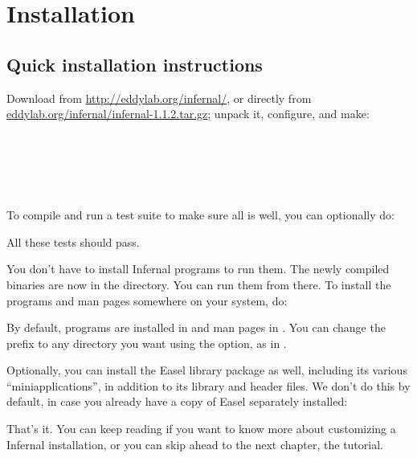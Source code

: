 \section{Installation}
\label{section:installation}
\setcounter{footnote}{0}

\subsection{Quick installation instructions}

Download  from \url{http://eddylab.org/infernal/}, or
directly from \\
\url{eddylab.org/infernal/infernal-1.1.2.tar.gz};
unpack it, configure, and make:

\\
\\
\\
\\ 

To compile and run a test suite to make sure all is well, you can
optionally do:


All these tests should pass.

You don't have to install Infernal programs to run them. The newly
compiled binaries are now in the  directory. You can run
them from there. To install the programs and man pages somewhere on
your system, do:


By default, programs are installed in  and man
pages in . You can change the
 prefix to any directory you want using the
 option, as in .

Optionally, you can install the Easel library package as well,
including its various ``miniapplications'', in addition to its library
and header files. We don't do this by default, in case you already
have a copy of Easel separately installed:


That's it.  You can keep reading if you want to know more about
customizing a Infernal installation, or you can skip ahead to the next
chapter, the tutorial.

